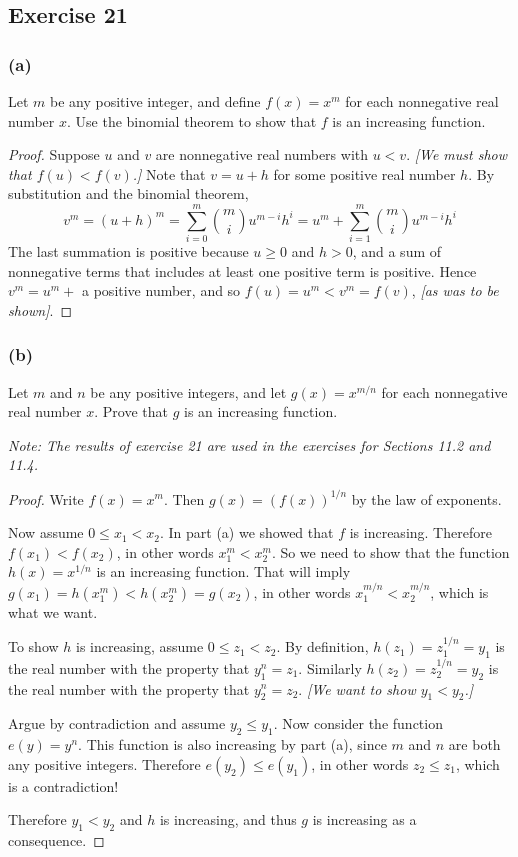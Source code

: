 \documentclass[14pt]{extarticle}
\begin{document}
\subsection{Exercise 21}
\subsubsection{(a)}
Let \(m\) be any positive integer, and define \(f(x) = x^m\) for each nonnegative real number \(x\). Use the binomial
theorem to show that \(f\) is an increasing function.

\begin{proof}
    Suppose \(u\) and \(v\) are nonnegative real numbers with \(u < v\). {\it [We must show that \(f(u) < f(v)\).]} Note that
    \(v = u + h\) for some positive real number \(h\). By substitution and the binomial theorem,
    \[
        v^m = (u+h)^m = \sum_{i = 0}^{m}\binom{m}{i} u^{m-i} h^i = u^m + \sum_{i = 1}^{m}\binom{m}{i} u^{m-i} h^i
    \]
    The last summation is positive because \(u \geq 0\) and \(h > 0\), and a sum of nonnegative terms that includes at least one
    positive term is positive. Hence \(v^m = u^m +\) a positive number, and so \(f(u) = u^m < v^m = f(v)\),
    {\it [as was to be shown]}.
\end{proof}

\subsubsection{(b)}
Let \(m\) and \(n\) be any positive integers, and let \(g(x) = x^{m/n}\) for each nonnegative real number \(x\). Prove that
\(g\) is an increasing function.

    {\it Note: The results of exercise 21 are used in the exercises for Sections 11.2 and 11.4.}

\begin{proof}
    Write \(f(x) = x^m\). Then \(g(x) = (f(x))^{1/n}\) by the law of exponents.

    Now assume \(0 \leq x_1 < x_2\). In part (a) we showed that \(f\) is increasing. Therefore \(f(x_1) < f(x_2)\), in other
    words \(x_1^m < x_2^m\). So we need to show that the function \(h(x) = x^{1/n}\) is an increasing function. That will imply
    \(g(x_1) = h(x_1^m) < h(x_2^m) = g(x_2)\), in other words \(x_1^{m/n} < x_2^{m/n}\), which is what we want.

    To show \(h\) is increasing, assume \(0 \leq z_1 < z_2\). By definition, \(h(z_1) = z_1^{1/n} = y_1\) is the real number
    with the property that \(y_1^n = z_1\). Similarly \(h(z_2) = z_2^{1/n} = y_2\) is the real number with the property that
    \(y_2^n = z_2\). {\it [We want to show \(y_1 < y_2\).]}

    Argue by contradiction and assume \(y_2 \leq y_1\). Now consider the function \(e(y) = y^n\). This function is also
    increasing by part (a), since \(m\) and \(n\) are both any positive integers. Therefore \(e(y_2) \leq e(y_1)\), in other
    words \(z_2 \leq z_1\), which is a contradiction!

    Therefore \(y_1 < y_2\) and \(h\) is increasing, and thus \(g\) is increasing as a consequence.
\end{proof}
\end{document}
